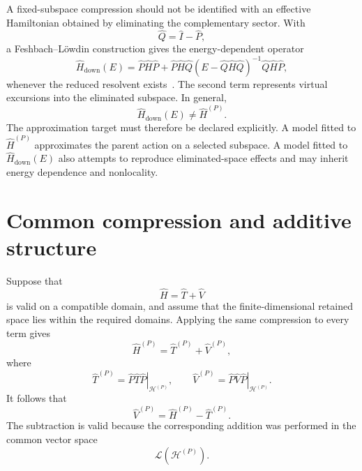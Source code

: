 A fixed-subspace compression should not be identified with an effective
Hamiltonian obtained by eliminating the complementary sector. With
\begin{equation}
    \hat Q=\hat I-\hat P,
\end{equation}
a Feshbach--L\"owdin construction gives the energy-dependent operator
\begin{equation}
    \hat H_{\mathrm{down}}(E)
    =
    \hat P\hat H\hat P
    +
    \hat P\hat H\hat Q
    \left(E-\hat Q\hat H\hat Q\right)^{-1}
    \hat Q\hat H\hat P,
\end{equation}
whenever the reduced resolvent exists~\cite{lowdin1982}. The second term
represents virtual excursions into the eliminated subspace. In general,
\begin{equation}
    \hat H_{\mathrm{down}}(E)
    \neq
    \hat H^{(P)}.
\end{equation}
The approximation target must therefore be declared explicitly. A model
fitted to $\hat H^{(P)}$ approximates the parent action on a selected subspace.
A model fitted to $\hat H_{\mathrm{down}}(E)$ also attempts to reproduce
eliminated-space effects and may inherit energy dependence and nonlocality.

\section*{Common compression and additive structure}

Suppose that
\begin{equation}
    \hat H=\hat T+\hat V
\end{equation}
is valid on a compatible domain, and assume that the finite-dimensional
retained space lies within the required domains. Applying the same compression
to every term gives
\begin{equation}
    \hat H^{(P)}
    =
    \hat T^{(P)}+\hat V^{(P)},
\end{equation}
where
\begin{equation}
    \hat T^{(P)}
    =
    \left.\hat P\hat T\hat P\right|_{\mathcal H^{(P)}},
    \qquad
    \hat V^{(P)}
    =
    \left.\hat P\hat V\hat P\right|_{\mathcal H^{(P)}}.
\end{equation}
It follows that
\begin{equation}
    \hat V^{(P)}
    =
    \hat H^{(P)}-\hat T^{(P)}.
\end{equation}
The subtraction is valid because the corresponding addition was performed in
the common vector space
\begin{equation}
    \mathcal L\!\left(\mathcal H^{(P)}\right).
\end{equation}

